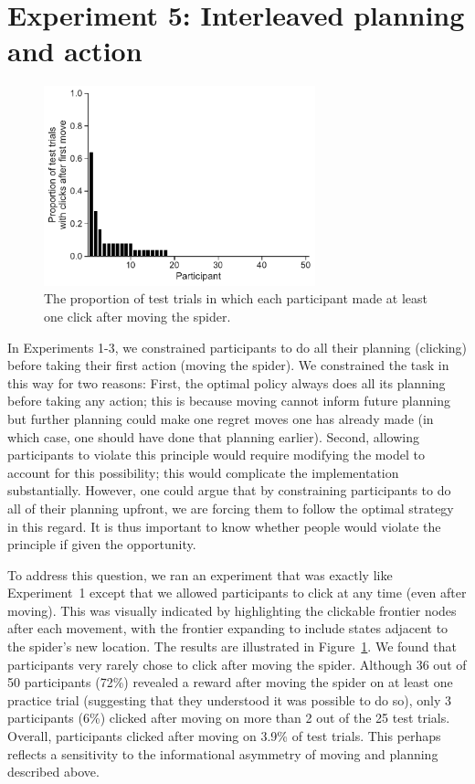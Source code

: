 \section{Experiment 5: Interleaved planning and action}\label{app:planning-experiment5}


\begin{figure}[t!]
    \centering
    \includegraphics[width=0.7\textwidth]{figs/planning/interleaved.pdf}
    \caption{ The proportion of test trials in which each participant made at least one click after moving the spider.}
    \label{fig:exp5}
\end{figure}


In Experiments 1-3, we constrained participants to do all their planning (clicking) before taking their first action (moving the spider). We constrained the task in this way for two reasons: First, the optimal policy always does all its planning before taking any action; this is because moving cannot inform future planning but further planning could make one regret moves one has already made (in which case, one should have done that planning earlier). Second, allowing participants to violate this principle would require modifying the model to account for this possibility; this would complicate the implementation substantially. However, one could argue that by constraining participants to do all of their planning upfront, we are forcing them to follow the optimal strategy in this regard. It is thus important to know whether people would violate the principle if given the opportunity.

To address this question, we ran an experiment that was exactly like Experiment~1 except that we allowed participants to click at any time (even after moving). This was visually indicated by highlighting the clickable frontier nodes after each movement, with the frontier expanding to include states adjacent to the spider's new location. The results are illustrated in Figure~\ref{fig:exp5}. We found that participants very rarely chose to click after moving the spider. Although 36 out of 50 participants (72\%) revealed a reward after moving the spider on at least one practice trial (suggesting that they understood it was possible to do so), only 3 participants (6\%) clicked after moving on more than 2 out of the 25 test trials. Overall, participants clicked after moving on 3.9\% of test trials. This perhaps reflects a sensitivity to the informational asymmetry of moving and planning described above.


